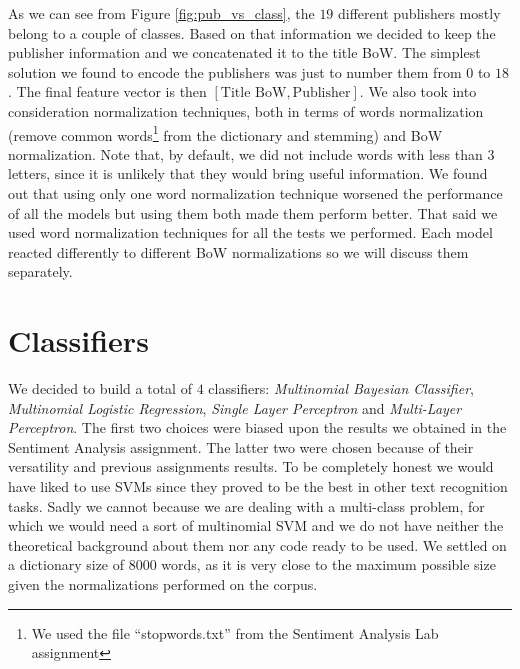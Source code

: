 \documentclass[10pt,a4paper]{report}
\begin{document}
As we can see from Figure \ref{fig:pub_vs_class}, the $19$ different publishers mostly belong to a couple of classes. Based on that information we decided to keep the publisher information and we concatenated it to the title BoW. The simplest solution we found to encode the publishers was just to number them from $0$ to $18$. The final feature vector is then $[\text{Title BoW}, \text{Publisher}]$. We also took into consideration normalization techniques, both in terms of words normalization (remove common words\footnote{We used the file \enquote{stopwords.txt} from the Sentiment Analysis Lab assignment} from the dictionary and stemming) and BoW normalization. Note that, by default, we did not include words with less than $3$ letters, since it is unlikely that they would bring useful information. We found out that using only one word normalization technique worsened the performance of all the models but using them both made them perform better. That said we used word normalization techniques for all the tests we performed. Each model reacted differently to different BoW normalizations so we will discuss them separately.  
\section{Classifiers}
We decided to build a total of $4$ classifiers: \textit{Multinomial Bayesian Classifier}, \textit{Multinomial Logistic Regression}, \textit{Single Layer Perceptron} and \textit{Multi-Layer Perceptron}. The first two choices were biased upon the results we obtained in the Sentiment Analysis assignment. The latter two were chosen because of their versatility and previous assignments results. To be completely honest we would have liked to use SVMs since they proved to be the best in other text recognition tasks. Sadly we cannot because we are dealing with a multi-class problem, for which we would need a sort of multinomial SVM and we do not have neither the theoretical background about them nor any code ready to be used. We settled on a dictionary size of $8000$ words, as it is very close to the maximum possible size given the normalizations performed on the corpus.
\end{document}
